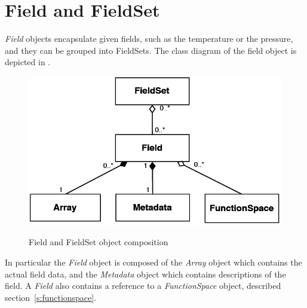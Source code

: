 \section{Field and FieldSet} \label{s:field-fieldset}
%
\emph{Field} objects encapsulate given fields, such as the temperature 
or the pressure, and they can be grouped into FieldSets.
The class diagram of the field object is depicted in .
%
\begin{figure}
\centering
\includegraphics[scale=0.25]{imgs/field.png}
\label{fig:field}
\caption{Field and FieldSet object composition}
\end{figure}
%
In particular the \emph{Field} object is composed of 
the \emph{Array} object which contains the actual field data, and the
\emph{Metadata} object which contains descriptions of the field.
A \emph{Field} also contains a reference to a \emph{FunctionSpace} object, 
described section~\ref{s:functionspace}.

